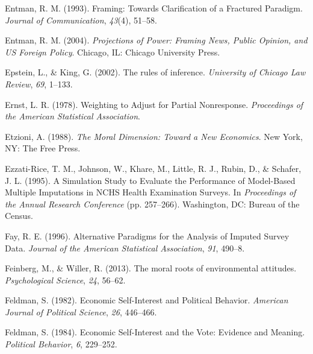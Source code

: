 \documentclass[12pt,econ]{sources/authesis}
\newenvironment{CSLReferences}%
  {}%
  {\par}
\begin{document}
\begin{CSLReferences}{1}{0}
\leavevmode{}%
Entman, R. M. (1993). Framing: {Towards} {Clarification} of a {Fractured} {Paradigm}. \emph{Journal of Communication}, \emph{43}(4), 51--58.

\leavevmode{}%
Entman, R. M. (2004). \emph{Projections of {Power}: {Framing} {News}, {Public} {Opinion}, and {US} {Foreign} {Policy}}. Chicago, IL: Chicago University Press.

\leavevmode{}%
Epstein, L., \& King, G. (2002). The rules of inference. \emph{University of Chicago Law Review}, \emph{69}, 1--133.

\leavevmode{}%
Ernst, L. R. (1978). {Weighting to Adjust for Partial Nonresponse}. \emph{Proceedings of the American Statistical Association}.

\leavevmode{}%
Etzioni, A. (1988). \emph{The {Moral} {Dimension}: {Toward} a {New} {Economics}}. New York, NY: The Free Press.

\leavevmode{}%
Ezzati-Rice, T. M., Johnson, W., Khare, M., Little, R. J., Rubin, D., \& Schafer, J. L. (1995). {A Simulation Study to Evaluate the Performance of Model-Based Multiple Imputations in NCHS Health Examination Surveys}. In \emph{{Proceedings of the Annual Research Conference}} (pp. 257--266). Washington, DC: Bureau of the Census.

\leavevmode{}%
Fay, R. E. (1996). {Alternative Paradigms for the Analysis of Imputed Survey Data}. \emph{Journal of the American Statistical Association}, \emph{91}, 490--8.

\leavevmode{}%
Feinberg, M., \& Willer, R. (2013). The moral roots of environmental attitudes. \emph{Psychological Science}, \emph{24}, 56--62.

\leavevmode{}%
Feldman, S. (1982). Economic {Self}-{Interest} and {Political} {Behavior}. \emph{American Journal of Political Science}, \emph{26}, 446--466.

\leavevmode{}%
Feldman, S. (1984). Economic {Self}-{Interest} and the {Vote}: {Evidence} and {Meaning}. \emph{Political Behavior}, \emph{6}, 229--252.


\end{CSLReferences}
\end{document}
